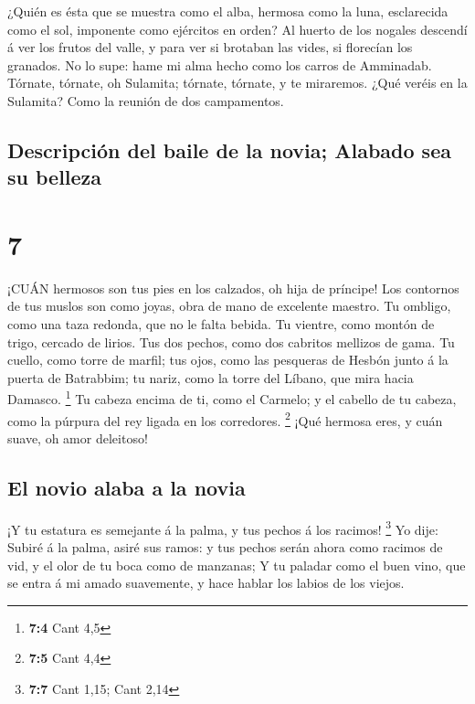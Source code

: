  ¿Quién es ésta que se muestra como el alba, hermosa como
la luna, esclarecida como el sol, imponente como ejércitos en orden?
 Al huerto de los nogales descendí á ver los frutos del
valle, y para ver si brotaban las vides, si florecían los granados.
 No lo supe: hame mi alma hecho como los carros de
Amminadab.  Tórnate, tórnate, oh Sulamita; tórnate,
tórnate, y te miraremos. ¿Qué veréis en la Sulamita? Como la reunión de
dos campamentos.

\hypertarget{descripciuxf3n-del-baile-de-la-novia-alabado-sea-su-belleza}{%
\subsection{Descripción del baile de la novia; Alabado sea su
belleza}\label{descripciuxf3n-del-baile-de-la-novia-alabado-sea-su-belleza}}

\hypertarget{section-6}{%
\section{7}\label{section-6}}

 ¡CUÁN hermosos son tus pies en los calzados, oh hija de
príncipe! Los contornos de tus muslos son como joyas, obra de mano de
excelente maestro.  Tu ombligo, como una taza redonda, que
no le falta bebida. Tu vientre, como montón de trigo, cercado de lirios.
 Tus dos pechos, como dos cabritos mellizos de gama.
 Tu cuello, como torre de marfil; tus ojos, como las
pesqueras de Hesbón junto á la puerta de Batrabbim; tu nariz, como la
torre del Líbano, que mira hacia Damasco. \footnote{\textbf{7:4} Cant
  4,5}  Tu cabeza encima de ti, como el Carmelo; y el
cabello de tu cabeza, como la púrpura del rey ligada en los corredores.
\footnote{\textbf{7:5} Cant 4,4}  ¡Qué hermosa eres, y cuán
suave, oh amor deleitoso!

\hypertarget{el-novio-alaba-a-la-novia}{%
\subsection{El novio alaba a la novia}\label{el-novio-alaba-a-la-novia}}

 ¡Y tu estatura es semejante á la palma, y tus pechos á los
racimos! \footnote{\textbf{7:7} Cant 1,15; Cant 2,14}  Yo
dije: Subiré á la palma, asiré sus ramos: y tus pechos serán ahora como
racimos de vid, y el olor de tu boca como de manzanas;  Y tu
paladar como el buen vino, que se entra á mi amado suavemente, y hace
hablar los labios de los viejos.

